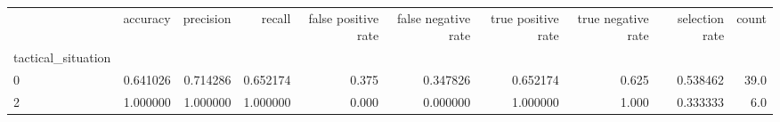 \begin{tabular}{lrrrrrrrrr}
\toprule
{} &  accuracy &  precision &    recall &  false positive rate &  false negative rate &  true positive rate &  true negative rate &  selection rate &  count \\
tactical\_situation &           &            &           &                      &                      &                     &                     &                 &        \\
\midrule
0                  &  0.641026 &   0.714286 &  0.652174 &                0.375 &             0.347826 &            0.652174 &               0.625 &        0.538462 &   39.0 \\
2                  &  1.000000 &   1.000000 &  1.000000 &                0.000 &             0.000000 &            1.000000 &               1.000 &        0.333333 &    6.0 \\
\bottomrule
\end{tabular}
